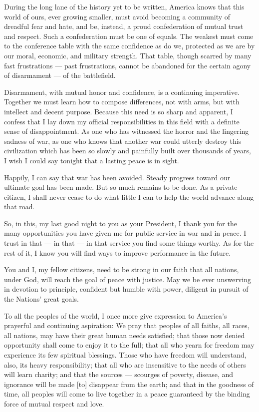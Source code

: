 \documentclass[a4paper]{amsbook}
\begin{document}
During the long lane of the history yet to be written, America knows that this world of ours, ever growing smaller, must avoid becoming a community of dreadful fear and hate, and be, instead, a proud confederation of mutual trust and respect. Such a confederation must be one of equals. The weakest must come to the conference table with the same confidence as do we, protected as we are by our moral, economic, and military strength. That table, though scarred by many fast frustrations — past frustrations, cannot be abandoned for the certain agony of disarmament — of the battlefield.

Disarmament, with mutual honor and confidence, is a continuing imperative. Together we must learn how to compose differences, not with arms, but with intellect and decent purpose. Because this need is so sharp and apparent, I confess that I lay down my official responsibilities in this field with a definite sense of disappointment. As one who has witnessed the horror and the lingering sadness of war, as one who knows that another war could utterly destroy this civilization which has been so slowly and painfully built over thousands of years, I wish I could say tonight that a lasting peace is in sight.

Happily, I can say that war has been avoided. Steady progress toward our ultimate goal has been made. But so much remains to be done. As a private citizen, I shall never cease to do what little I can to help the world advance along that road.

So, in this, my last good night to you as your President, I thank you for the many opportunities you have given me for public service in war and in peace. I trust in that — in that — in that service you find some things worthy. As for the rest of it, I know you will find ways to improve performance in the future.

You and I, my fellow citizens, need to be strong in our faith that all nations, under God, will reach the goal of peace with justice. May we be ever unswerving in devotion to principle, confident but humble with power, diligent in pursuit of the Nations' great goals.

To all the peoples of the world, I once more give expression to America's prayerful and continuing aspiration: We pray that peoples of all faiths, all races, all nations, may have their great human needs satisfied; that those now denied opportunity shall come to enjoy it to the full; that all who yearn for freedom may experience its few spiritual blessings. Those who have freedom will understand, also, its heavy responsibility; that all who are insensitive to the needs of others will learn charity; and that the sources — scourges of poverty, disease, and ignorance will be made [to] disappear from the earth; and that in the goodness of time, all peoples will come to live together in a peace guaranteed by the binding force of mutual respect and love.
\end{document}
